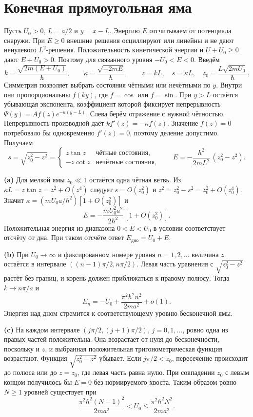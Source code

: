 \documentclass[11pt,a4paper]{article}
\begin{document}

\section{Конечная прямоугольная яма}

Пусть \(U_0>0\), \(L=a/2\) и \(y=x-L\). Энергию \(E\) отсчитываем
от потенциала снаружи. При \(E\ge0\) внешние решения осциллируют
или линейны и не дают ненулевого \(L^2\)-решения. Положительность
кинетической энергии и \(U+U_0\ge0\) дают \(E+U_0>0\).
Поэтому для связанного уровня \(-U_0<E<0\).
Введём
\[
 k=\frac{\sqrt{2m(E+U_0)}}{\hbar},\qquad
 \kappa=\frac{\sqrt{-2mE}}{\hbar},\qquad
 z=kL,\quad s=\kappa L,\quad z_0=\frac{L\sqrt{2mU_0}}{\hbar}.
\]
Симметрия позволяет выбрать состояния чётными или нечётными
по \(y\). Внутри они пропорциональны \(f(ky)\), где
\(f=\cos\) или \(f=\sin\). При \(y>L\) остаётся убывающая
экспонента, коэффициент которой фиксирует непрерывность
\(\Psi(y)=A f(z)e^{-\kappa(y-L)}\). Слева берём отражение
с нужной чётностью. Непрерывность производной даёт
\(k f'(z)=-\kappa f(z)\). Значение \(f(z)=0\) потребовало бы
одновременно \(f'(z)=0\), поэтому деление допустимо. Получаем
\[
 s=\sqrt{z_0^2-z^2}=
 \begin{cases}
 z\tan z & \text{чётные состояния},\\
 -z\cot z & \text{нечётные состояния},
 \end{cases}
 \qquad
 E=-\frac{\hbar^2}{2mL^2}\,(z_0^2-z^2).
\]

\textbf{(a)} Для мелкой ямы \(z_0\ll1\) остаётся одна чётная
ветвь. Из \(\kappa L=z\tan z=z^2+O(z^4)\) следует
\(s=O(z_0^2)\) и \(z^2=z_0^2-s^2=z_0^2+O(z_0^4)\).
Значит \(\kappa=(mU_0 a/\hbar^2)[1+O(z_0^2)]\) и
\[
 E=-\frac{mU_0^2a^2}{2\hbar^2}\,[1+O(z_0^2)] .
\]
Положительная энергия из диапазона \(0<E<U_0\) в условии
соответствует отсчёту от дна. При таком отсчёте ответ
\(E_{\text{дно}}=U_0+E\).

\textbf{(b)} При \(U_0\to\infty\) и фиксированном номере
уровня \(n=1,2,\ldots\) величина \(z\) остаётся в интервале
\(((n-1)\pi/2,n\pi/2)\). Левая часть уравнения
с \(\sqrt{z_0^2-z^2}\) растёт без границ, и корень должен
приближаться к правому полюсу. Тогда \(k\to n\pi/a\) и
\[
 E_n=-U_0+\frac{\pi^2\hbar^2 n^2}{2ma^2}+o(1).
\]
Энергия над дном стремится к соответствующему уровню бесконечной ямы.

\textbf{(c)} На каждом интервале
\((j\pi/2,(j+1)\pi/2)\), \(j=0,1,\ldots\), ровно одна из
правых частей положительна. Она возрастает от нуля до бесконечности,
поскольку и \(z\), и выбранная положительная тригонометрическая
функция возрастают. Функция \(\sqrt{z_0^2-z^2}\) убывает.
Если \(j\pi/2<z_0\), пересечение происходит до полюса или до
\(z=z_0\), где левая часть равна нулю. При совпадении \(z_0\)
с левым концом получилось бы
\(E=0\) без нормируемого хвоста. Таким образом ровно \(N\ge1\)
уровней существует при
\[
 \frac{\pi^2\hbar^2(N-1)^2}{2ma^2}<U_0\le
 \frac{\pi^2\hbar^2 N^2}{2ma^2}.
\]
\end{document}
